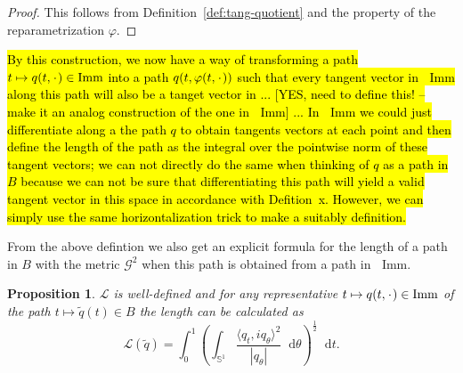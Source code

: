 \message{ !name(tangent_space_of_curves.tex)}\documentclass[a4,danish]{article}
\theoremstyle{break}
\newtheorem{proposition}[subsection]{Proposition}
\theoremstyle{definition}
\theoremstyle{Break}
\newcommand*\I{\mathop{}\!\mathrm{Imm}}
\renewcommand{\S}{\mathbb{S}}
\newcommand{\blank}{\makebox[1ex]{\textbf{$\cdot$}}}
\renewcommand{\phi}{\varphi}
\newcommand*\diff{\mathop{}\!\mathrm{d}}
\begin{document}
\begin{proof}
  This follows from Definition~\ref{def:tang-quotient} and the property of the reparametrization $\phi$. 
\end{proof}

\hl{By this construction, we now have a way of transforming a path $t \mapsto q(t,\blank) \in \I$ into a path $q(t, \phi(t, \blank))$ such that every tangent vector in $\I$ along this path will also be a tanget vector in ... [YES, need to define this! -- make it an analog construction of the one in $\I$] ... In $\I$ we could just differentiate along a the path $q$ to obtain tangents vectors at each point and then define the length of the path as the integral over the pointwise norm of these tangent vectors; we can not directly do the same when thinking of $q$ as a path in $B$ because we can not be sure that differentiating this path will yield a valid tangent vector in this space in accordance with Defition~x. However, we can simply use the same horizontalization trick to make a suitably definition.}




From the above defintion we also get an explicit formula for the length of a path in $B$ with the metric $\mathcal{G}^2$ when this path is obtained from a path in $\I$.

\begin{proposition}
    $\mathcal{L}$ is well-defined and for any representative $t \mapsto q(t, \blank) \in \I $ of the path $t \mapsto \tilde{q}(t) \in B$ the length can be calculated as
    \begin{equation}
      \label{eq:length-quotient}
    \mathcal{L}(\tilde{q}) = \int_{0}^{1} 
    \left(
      \int_{\S^1}  \frac{\langle q_t, i q_{\theta}\rangle^2}{|q_{\theta}|} \diff \theta
    \right)^{\frac{1}{2}} \diff t.
  \end{equation}
\end{proposition}
\end{document}
